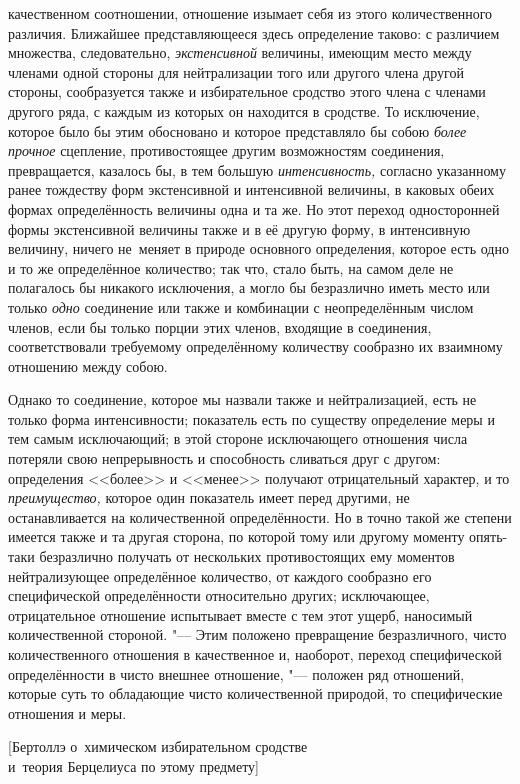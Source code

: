 качественном соотношении, отношение изымает себя из этого количественного
различия. Ближайшее представляющееся здесь определение таково: с различием
множества, следовательно, {\em экстенсивной} величины, имеющим место между
членами одной стороны для нейтрализации того или другого члена другой стороны,
сообразуется также и избирательное сродство этого члена с членами другого ряда,
с каждым из которых он находится в сродстве. То исключение, которое было бы
этим обосновано и которое представляло бы собою {\em более прочное} сцепление,
противостоящее другим возможностям соединения, превращается, казалось бы, в тем
большую {\em интенсивность,} согласно указанному ранее тождеству форм
экстенсивной и интенсивной величины, в каковых обеих формах определённость
величины одна и та же. Но этот переход односторонней формы экстенсивной
величины также и в её другую форму, в интенсивную величину, ничего не~меняет
в природе основного определения, которое есть одно и то же определённое
количество; так что, стало быть, на самом деле не полагалось бы никакого
исключения, а могло бы безразлично иметь место или только {\em одно} соединение
или также и комбинации с неопределённым числом членов, если бы только порции
этих членов, входящие в соединения, соответствовали требуемому определённому
количеству сообразно их взаимному отношению между собою.

Однако то соединение, которое мы назвали также и нейтрализацией, есть не только
форма интенсивности; показатель есть по существу определение меры и тем самым
исключающий; в этой стороне исключающего отношения числа потеряли свою
непрерывность и способность сливаться друг с другом: определения <<более>> и
<<менее>> получают отрицательный характер, и то {\em преимущество,} которое
один показатель имеет перед другими, не останавливается на количественной
определённости. Но в точно такой же степени имеется также и та другая сторона,
по которой тому или другому моменту опять-таки безразлично получать от
нескольких противостоящих ему моментов нейтрализующее определённое количество,
от каждого сообразно его специфической определённости относительно других;
исключающее, отрицательное отношение испытывает вместе с тем этот ущерб,
наносимый количественной стороной. "--- Этим положено превращение
безразличного, чисто количественного отношения в качественное и, наоборот,
переход специфической определённости в чисто внешнее отношение, "--- положен
ряд отношений, которые суть то обладающие чисто количественной природой, то
специфические отношения и меры.

%
{[Бертоллэ о~химическом избирательном сродстве\\
и~теория Берцелиуса по этому предмету]}

